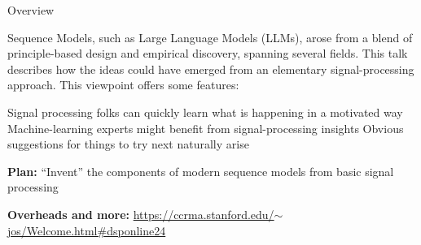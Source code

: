 \begin{slide}[\slideopts,method=direct,toc={}]{Overview}

Sequence Models, such as Large Language Models (LLMs), arose from a blend of principle-based design and empirical discovery, spanning several fields.
\maybepause
This talk describes how the ideas could have emerged from an elementary signal-processing approach.
\maybepause
This viewpoint offers some features:
\begin{enumerate}
\mpitem Signal processing folks can quickly learn what is happening in a motivated way
\mpitem Machine-learning experts might benefit from signal-processing insights
\mpitem Obvious suggestions for things to try next naturally arise
\end{enumerate}


\vspace{1em}
\maybepause
\textbf{Plan:}
\maybepause
``Invent'' the components of modern sequence models from basic signal processing

\vspace{1em}
\maybepause
\textbf{Overheads and more:} \href{https://ccrma.stanford.edu/~jos/Welcome.html#dsponline24}{https://ccrma.stanford.edu/$\sim$jos/Welcome.html\#dsponline24}

\end{slide}

